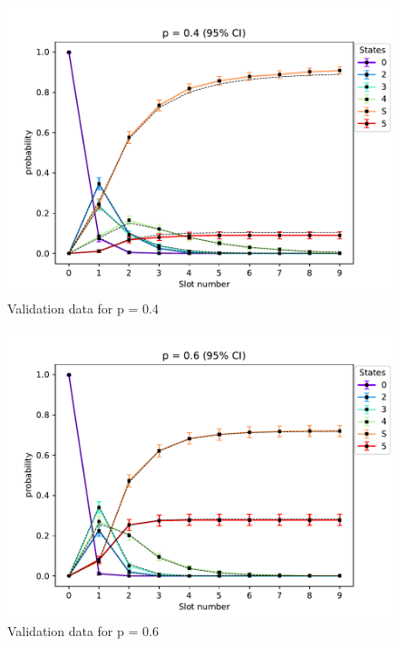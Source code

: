 \begin{figure}[H]
    \begin{center}
        \includegraphics[scale=0.7]{img/star5to1p=0.4validation.pdf}
        \caption{Validation data for p = 0.4}
        \label{fig:5to1validPlot1}
    \end{center}
    \vspace*{-0.8cm}
\end{figure}


\begin{figure}[H]
    \begin{center}
        \includegraphics[scale=0.7]{img/star5to1p=0.6validation.pdf}
        \caption{Validation data for p = 0.6}
        \label{fig:5to1validPlot2}
    \end{center}
    \vspace*{-0.8cm}
\end{figure}
